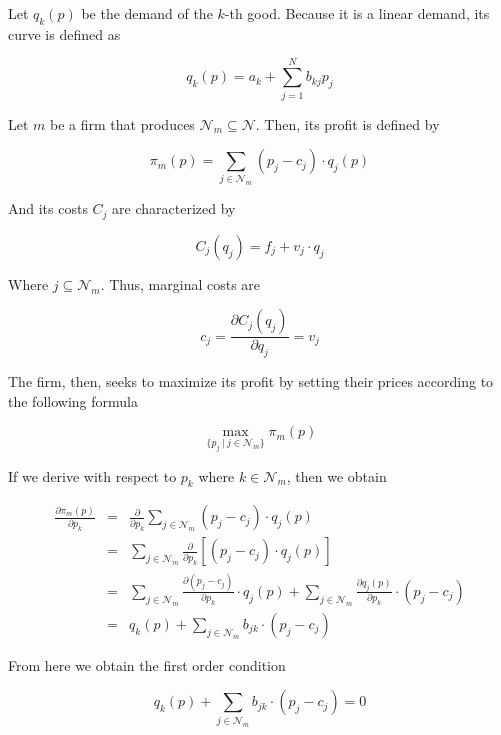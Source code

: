 \documentclass[12pt]{article}
\begin{document}
Let $q_k (p)$ be the demand of the $k$-th good. Because it is a linear demand, its curve is defined as

\begin{equation*}
q_k(p) = a_k + \sum_{j=1}^N b_{kj}p_j
\end{equation*}

Let $m$ be a firm that produces $\mathcal{N}_m \subseteq \mathcal{N}$. Then, its profit is defined by

\begin{equation*}
\pi_m(p) = \sum_{j \in \mathcal{N}_m} (p_j - c_j)\cdot q_j(p)
\end{equation*}

And its costs $C_j$ are characterized by

\begin{equation*}
C_j (q_j)= f_j + v_j \cdot q_j
\end{equation*}

Where $j \subseteq \mathcal{N}_m$. Thus, marginal costs are

\begin{equation*}
c_j = \frac{\partial C_j(q_j)}{\partial q_j}= v_j
\end{equation*}


The firm, then, seeks to maximize its profit by setting their prices according to the following formula

\begin{equation*}
\max_{\{p_j ~ | ~ j \in \mathcal{N}_m\}} \pi_m(p)
\end{equation*}

If we derive with respect to $p_k$ where $k\in \mathcal{N}_m$, then we obtain

\begin{eqnarray*}
\frac{\partial\pi_m(p)}{\partial p_k} &=& \frac{\partial}{\partial p_k} \sum_{j \in \mathcal{N}_m} (p_j - c_j) \cdot q_j(p) \\
&=& \sum_{j \in \mathcal{N}_m} \frac{\partial}{\partial p_k} \left[(p_j - c_j) \cdot q_j(p)\right] \\
&=& \sum_{j \in \mathcal{N}_m} \frac{\partial (p_j - c_j)}{\partial p_k} \cdot q_j(p) + \sum_{j \in \mathcal{N}_m} \frac{\partial q_j(p)}{\partial p_k} \cdot (p_j - c_j)\\
&=& q_k(p) + \sum_{j \in \mathcal{N}_m} b_{jk} \cdot (p_j - c_j) 
\end{eqnarray*}

From here we obtain the first order condition

\begin{equation*}
q_k(p) + \sum_{j \in \mathcal{N}_m} b_{jk} \cdot (p_j - c_j) = 0
\end{equation*}
\end{document}
